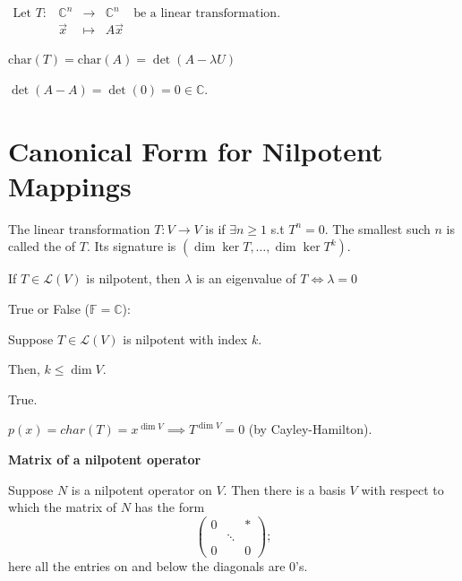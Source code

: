 \documentclass[11pt,fleqn]{book} %
\begin{document}
\begin{example}
{~~~}

    $\begin{matrix}\text{Let } T: &\mathbb{C}^n &\to &\mathbb{C}^n &\text{be a linear transformation. }\\ &\vec{x} &\mapsto &A\vec{x} \end{matrix}$

    $\mathrm{char}(T) = \mathrm{char}(A) = \det(A - \lambda U)$

    $\det(A - A) = \det(0) = 0 \in \mathbb{C}$.
\end{example}

\section{Canonical Form for Nilpotent Mappings}
\setcounter{section}{0}
\setcounter{definitionT}{2}
\begin{definition}[Niplotent]
    The linear transformation $T: V \to V$ is  if $\exists n \ge 1$ s.t $T^n = 0$. The smallest such $n$ is called the  of $T$. Its signature is $(\dim \ker T, \dots, \dim\ker T^k)$.
\end{definition}

 If $T \in \mathcal{L}(V)$ is nilpotent, then $\lambda$ is an eigenvalue of $T \iff \lambda = 0$

\begin{example}
    True or False ($\mathbb{F} = \mathbb{C}$):

    Suppose $T \in \mathcal{L}(V)$ is nilpotent with index $k$.

    Then, $k \le \dim V$.

    {\color{lightblue} True.

    $p(x) = char(T) = x^{\dim V} \implies T^{\dim V} = 0$ (by Cayley-Hamilton). }
\end{example}

\textbf{Matrix of a nilpotent operator}

Suppose $N$ is a nilpotent operator on $V$. Then there is a basis $V$ with respect to which the matrix of $N$ has the form $$\begin{pmatrix} 0 & &* \\ &\ddots \\0 & &0 \end{pmatrix};$$ here all the entries on and below the diagonals are $0$'s.
\end{document}
